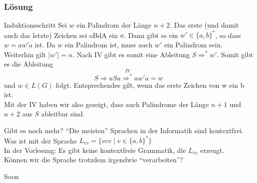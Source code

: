 \begin{frame}
	\frametitle{Lösung}
		\begin{block}{Induktionsschritt}
			Sei $w$ ein Palindrom der Länge $n + 2$. Das erste (und damit auch das letzte) Zeichen sei oBdA ein $a$. Dann gibt es ein $w' \in \{a, b\}^\ast$, so dass $w = aw'a$ ist. Da $w$ ein Palindrom ist, muss auch $w'$ ein Palindrom sein. Weiterhin gilt $|w'| = n$. \pause Nach IV gibt es somit eine Ableitung $S \Rightarrow^\ast w'$. Somit gibt es die Ableitung $$S \Rightarrow aSa \overset{IV}{\Rightarrow^\ast} aw'a = w$$ und $w \in L(G)$ folgt. \pause Entsprechendes gilt, wenn das erste Zeichen von w ein b ist. \\
			Mit der IV haben wir also gezeigt, dass auch Palindrome der Länge $n+1$ und $n+2$ aus $S$ ableitbar sind.
	\end{block}

\end{frame}

\begin{frame}{Gibt es noch mehr?}
	\enquote{Die meisten} Sprachen in der Informatik sind kontextfrei.\\[1em]
	Was ist mit der Sprache $L_{vv} = \{vcv \mid v \in \{a, b\}^*\}$\\
	\pause
	In der Vorlesung: Es gibt keine kontextfreie Grammatik, die $L_{vv}$ erzeugt.\\
	\pause
	Können wir die Sprache trotzdem irgendwie \enquote{verarbeiten}?
	
	\begin{block}{}
		\Large
		\centering
		Soon\\[1em]
	\end{block}
\end{frame}
